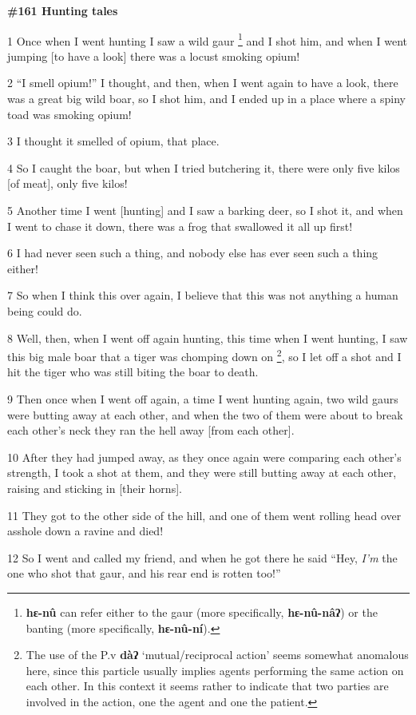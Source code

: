 
\textbf{\#161 Hunting tales}

1 Once when I went hunting I saw a wild gaur \footnote{\textbf{hɛ-nû} can refer either to the gaur (more specifically, \textbf{hɛ-nû-nâʔ}) or the banting (more specifically, \textbf{hɛ-nû-ní}).} and I shot him, and when I went
jumping [to have a look] there was a locust smoking opium!

2 ``I smell opium!'' I thought, and then, when I went again to have a look, there
was a great big wild boar, so I shot him, and I ended up in a place where a spiny
toad was smoking opium!

3 I thought it smelled of opium, that place.

4 So I caught the boar, but when I tried butchering it, there were only five kilos
[of meat], only five kilos!

5 Another time I went [hunting] and I saw a barking deer, so I shot it, and when
I went to chase it down, there was a frog that swallowed it all up first!

6 I had never seen such a thing, and nobody else has ever seen such a thing either!

7 So when I think this over again, I believe that this was not anything a human
being could do.

8 Well, then, when I went off again hunting, this time when I went hunting, I saw
this big male boar that a tiger was chomping down on \footnote{The use of the P.v \textbf{dàʔ} `mutual/reciprocal action' seems somewhat anomalous here, since this particle usually implies agents performing the same action on each other. In this context it seems rather to indicate that two parties are involved in the action, one the agent and one the patient.}, so I let off a shot and
I hit the tiger who was still biting the boar to death.

9 Then once when I went off again, a time I went hunting again, two wild gaurs
were butting away at each other, and when the two of them were about to break each
other's neck they ran the hell away [from each other].

10 After they had jumped away, as they once again were comparing each other's strength,
I took a shot at them, and they were still butting away at each other, raising
and sticking in [their horns].

11 They got to the other side of the hill, and one of them went rolling head over
asshole down a ravine and died!

12 So I went and called my friend, and when he got there he said ``Hey, \textit{I'm}
the one who shot that gaur, and his rear end is rotten too!''

